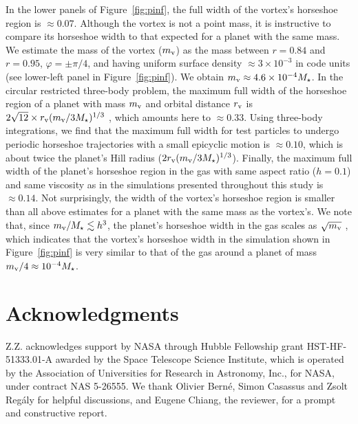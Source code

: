 \documentclass[a4paper,usenatbib]{mnras}
\begin{document}
In the lower panels of Figure~\ref{fig:pinf}, the full width of the
vortex's horseshoe region is $\approx 0.07$. Although the vortex is
not a point mass, it is instructive to compare its horseshoe width to
that expected for a planet with the same mass. We
  estimate the mass of the vortex ($m_{\rm v}$) as the mass between $r
  = 0.84$ and $r=0.95$, $\varphi = \pm \pi/4$, and having uniform
  surface density $\approx 3\times 10^{-3}$ in code units (see
  lower-left panel in Figure~\ref{fig:pinf}).  We obtain $m_{\rm v}
  \approx 4.6\times10^{-4}M_{\star}$. In the circular restricted
  three-body problem, the maximum full width of the horseshoe region
  of a planet with mass $m_{\rm v}$ and orbital distance $r_{\rm v}$
  is $2\sqrt{12}\times r_{\rm v}(m_{\rm v}/3M_{\star})^{1/3}$
  \citep{MurrayDermottBook}, which amounts here to $\approx 0.33$.
  Using three-body integrations, we find that the maximum full width
  for test particles to undergo periodic horseshoe trajectories with a
  small epicyclic motion is $\approx 0.10$, which is about twice the
  planet's Hill radius ($2r_{\rm v} ( m_{\rm v}/
  3M_{\star})^{1/3}$). Finally, the maximum full width of the planet's
  horseshoe region in the gas with same aspect ratio ($h = 0.1$) and
  same viscosity as in the simulations presented throughout this study
  is $\approx 0.14$. Not surprisingly, the width of the vortex's
  horseshoe region is smaller than all above estimates for a planet
  with the same mass as the vortex's. We note that, since $m_{\rm v} /
  M_{\star} \lesssim h^3$, the planet's horseshoe width in the gas
  scales as $\sqrt{m_{\rm v}}$ \citep[e.g.,][]{mak2006}, which
  indicates that the vortex's horseshoe width in the simulation shown
  in Figure~\ref{fig:pinf} is very similar to that of the gas around a
  planet of mass $m_{\rm v}/4 \approx 10^{-4}M_{\star}$.

\section*{Acknowledgments}
Z.Z. acknowledges support by NASA through Hubble Fellowship grant
HST-HF-51333.01-A awarded by the Space Telescope Science Institute,
which is operated by the Association of Universities for Research in
Astronomy, Inc., for NASA, under contract NAS 5-26555. We thank
Olivier Bern{\'e}, Simon Casassus and Zsolt Reg{\'a}ly for helpful
discussions, and Eugene Chiang, the reviewer, for a prompt and
constructive report.
\end{document}
